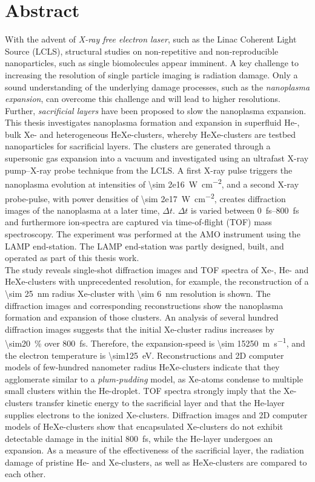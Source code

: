 \section*{Abstract}\label{ch:abstract}
With the advent of \textit{X-ray free electron laser}, such as the Linac Coherent Light Source (LCLS), structural studies on non-repetitive and non-reproducible nanoparticles, such as single biomolecules appear imminent. A key challenge to increasing the resolution of single particle imaging is radiation damage. Only a sound understanding of the underlying damage processes, such as the \textit{nanoplasma expansion}, can overcome this challenge and will lead to higher resolutions. Further, \textit{sacrificial layers} have been proposed to slow the nanoplasma expansion.\\[0.4\baselineskip]
%
This thesis investigates nanoplasma formation and expansion in superfluid He-, bulk Xe- and heterogeneous HeXe-clusters, whereby HeXe-clusters are testbed nanoparticles for sacrificial layers. The clusters are generated through a supersonic gas expansion into a vacuum and investigated using an ultrafast X-ray pump--X-ray probe technique from the LCLS. A first X-ray pulse triggers the nanoplasma evolution at intensities of \SI{\sim 2e16}{\watt\per\square\centi\meter}, and a second X-ray probe-pulse, with power densities of \SI{\sim 2e17}{\watt\per\square\centi\meter}, creates diffraction images of the nanoplasma at a later time, $\Delta t$. $\Delta t$ is varied between \SIrange{0}{800}{\femto\second} and furthermore ion-spectra are captured via time-of-flight (TOF) mass spectroscopy. The experiment was performed at the AMO instrument using the LAMP end-station. The LAMP end-station was partly designed, built, and operated as part of this thesis work.\\[0.4\baselineskip]
%
The study reveals single-shot diffraction images and TOF spectra of Xe-, He- and HeXe-clusters with unprecedented resolution, for example, the reconstruction of a \SI{\sim 25}{\nano\meter} radius Xe-cluster with \SI{\sim 6}{\nano\meter} resolution is shown. The diffraction images and corresponding reconstructions show the nanoplasma formation and expansion of those clusters. An analysis of several hundred diffraction images suggests that the initial Xe-cluster radius increases by \SI{\sim20}{\percent} over \SI{800}{\femto\second}. Therefore, the expansion-speed is \SI{\sim 15250}{\meter\per\second}, and the electron temperature is \SI{\sim125}{\electronvolt}. Reconstructions and 2D computer models of few-hundred nanometer radius HeXe-clusters indicate that they agglomerate similar to a \textit{plum-pudding} model, as Xe-atoms condense to multiple small clusters within the He-droplet. TOF spectra strongly imply that the Xe-clusters transfer kinetic energy to the sacrificial layer and that the He-layer supplies electrons to the ionized Xe-clusters. Diffraction images and 2D computer models of HeXe-clusters show that encapsulated Xe-clusters do not exhibit detectable damage in the initial \SI{800}{\femto\second}, while the He-layer undergoes an expansion. As a measure of the effectiveness of the sacrificial layer, the radiation damage of pristine He- and Xe-clusters, as well as HeXe-clusters are compared to each other.
%
%
%
%